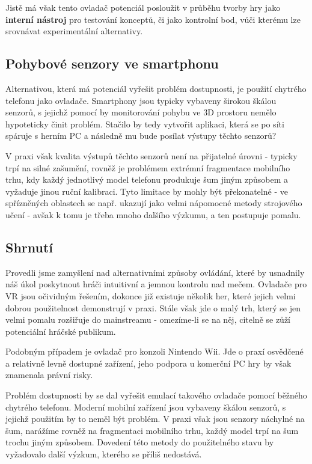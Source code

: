 Jistě má však tento ovladač potenciál posloužit v průběhu tvorby hry jako \textbf{interní nástroj} pro testování konceptů, či jako kontrolní bod, vůči kterému lze srovnávat experimentální alternativy.

\subsection{Pohybové senzory ve smartphonu}

Alternativou, která má potenciál vyřešit problém dostupnosti, je použití chytrého telefonu jako ovladače. Smartphony jsou typicky vybaveny širokou škálou senzorů, s jejichž pomocí by monitorování pohybu ve 3D prostoru nemělo hypoteticky činit problém. Stačilo by tedy vytvořit aplikaci, která se po síti spáruje s herním PC a následně mu bude posílat výstupy těchto senzorů?

V praxi však kvalita výstupů těchto senzorů není na přijatelné úrovni \cite{SmartphoneSensorsEvaluation} - typicky trpí na silné zašumění, rovněž je problémem extrémní fragmentace mobilního trhu, kdy každý jednotlivý model telefonu produkuje šum jiným způsobem a vyžaduje jinou ruční kalibraci. Tyto limitace by mohly být překonatelné - ve spřízněných oblastech se např. ukazují jako velmi nápomocné metody strojového učení \cite{AccelerometerStepDetectionUsingML} - avšak k tomu je třeba mnoho dalšího výzkumu, a ten postupuje pomalu.

\subsection{Shrnutí}
Provedli jsme zamyšlení nad alternativními způsoby ovládání, které by usnadnily náš úkol poskytnout hráči intuitivní a jemnou kontrolu nad mečem. Ovladače pro \acs{VR} jsou očividným řešením, dokonce již existuje několik her, které jejich velmi dobrou použitelnost demonstrují v praxi. Stále však jde o malý trh, který se jen velmi pomalu rozšiřuje do mainstreamu - omezíme-li se na něj, citelně se zůží potenciální hráčské publikum.

Podobným případem je ovladač pro konzoli Nintendo Wii. Jde o praxí osvědčené a relativně levně dostupné zařízení, jeho podpora u komerční PC hry by však znamenala právní risky.

Problém dostupnosti by se dal vyřešit emulací takového ovladače pomocí běžného chytrého telefonu. Moderní mobilní zařízení jsou vybaveny škálou senzorů, s jejichž použitím by to neměl být problém. V praxi však jsou senzory náchylné na šum, narážíme rovněž na fragmentaci mobilního trhu, každý model trpí na šum trochu jiným způsobem. Dovedení této metody do použitelného stavu by vyžadovalo další výzkum, kterého se příliš nedostává.

